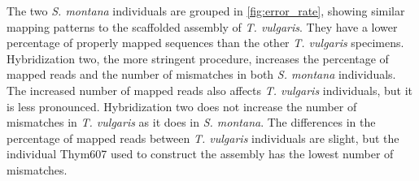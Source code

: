 The two \textit{S. montana} individuals are grouped in \autoref{fig:error_rate}, showing similar mapping patterns to the scaffolded assembly of \textit{T. vulgaris}. They have a lower percentage of properly mapped sequences than the other \textit{T. vulgaris} specimens. Hybridization two, the more stringent procedure, increases the percentage of mapped reads and the number of mismatches in both \textit{S. montana} individuals.\\

The increased number of mapped reads also affects \textit{T. vulgaris} individuals, but it is less pronounced. Hybridization two does not increase the number of mismatches in \textit{T. vulgaris} as it does in \textit{S. montana}. The differences in the percentage of mapped reads between \textit{T. vulgaris} individuals are slight, but the individual Thym607 used to construct the assembly has the lowest number of mismatches.